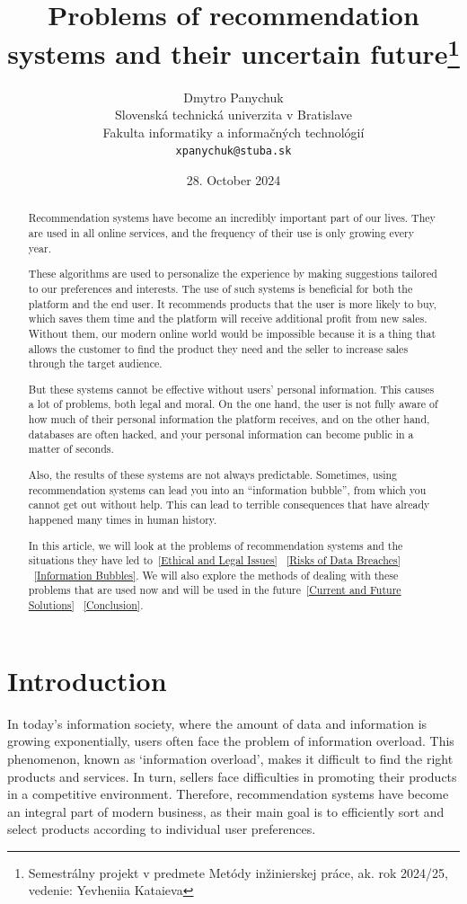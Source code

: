 \documentclass[10pt,twoside,slovak,a4paper]{article}
\title{Problems of recommendation systems and their uncertain future\thanks{Semestrálny projekt v predmete Metódy inžinierskej práce, ak. rok 2024/25, vedenie: Yevheniia Kataieva }}
\author{Dmytro Panychuk\\[2pt]
	{\small Slovenská technická univerzita v Bratislave}\\
	{\small Fakulta informatiky a informačných technológií}\\
	{\small \texttt{xpanychuk@stuba.sk}}
	}
\date{\small 28. October 2024}
\begin{document}
\maketitle

\begin{abstract}



Recommendation systems have become an incredibly important part of our lives. They are used in all online services, and the frequency of their use is only growing every year. 

These algorithms are used to personalize the experience by making suggestions tailored to our preferences and interests\cite{experience}. The use of such systems is beneficial for both the platform and the end user. It recommends products that the user is more likely to buy, which saves them time and the platform will receive additional profit from new sales\cite{comerce}.  Without them, our modern online world would be impossible because it is a thing that allows the customer to find the product they need and the seller to increase sales through the target audience.

But these systems cannot be effective without users' personal information. This causes a lot of problems, both legal and moral. On the one hand, the user is not fully aware of how much of their personal information the platform receives, and on the other hand, databases are often hacked, and your personal information can become public in a matter of seconds\cite{zdroj}.

Also, the results of these systems are not always predictable. Sometimes, using recommendation systems can lead you into an “information bubble”\cite{boubble}, from which you cannot get out without help. This can lead to terrible consequences that have already happened many times in human history. 

In this article, we will look at the problems of recommendation systems and the situations they have led to~\ref{Ethical and Legal Issues} ~\ref{Risks of Data Breaches} ~\ref{Information Bubbles}. We will also explore the methods of dealing with these problems that are used now and will be used in the future~\ref{Current and Future Solutions} ~\ref{Conclusion}.
\newpage

\end{abstract}


\newpage
\section{Introduction}
In today's information society, where the amount of data and information is growing exponentially, users often face the problem of information overload\cite{overload}. This phenomenon, known as ‘information overload’, makes it difficult to find the right products and services. In turn, sellers face difficulties in promoting their products in a competitive environment\cite{business}. Therefore, recommendation systems have become an integral part of modern business\cite{comerce}, as their main goal is to efficiently sort and select products according to individual user preferences.
\end{document}
